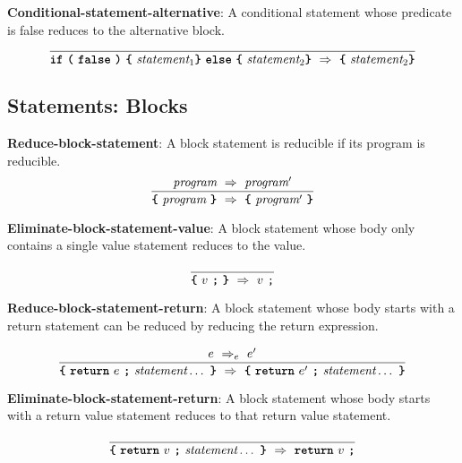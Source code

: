 \textbf{Conditional-statement-alternative}: A conditional statement
whose predicate is false reduces to the alternative block.
\[
\frac{
}{  
  \textbf{\texttt{if}}\ 
  \textbf{\texttt{(}}\ 
  \textbf{\texttt{false}} \ 
  \textbf{\texttt{)}} \ 
  \textbf{\texttt{\{}} \
  \textit{statement}_1
  \textbf{\texttt{\}}} \ 
  \textbf{\texttt{else}} \ 
  \textbf{\texttt{\{}} \
\textit{statement}_2  
  \textbf{\texttt{\}}}
\ \Rightarrow \ 
  \textbf{\texttt{\{}} \
  \textit{statement}_2 
  \textbf{\texttt{\}}}
}
\]

\subsection*{Statements: Blocks}

\textbf{Reduce-block-statement}: A block statement is
reducible if its program is reducible.
\[
\frac{
  \textit{program} 
\ \Rightarrow \ 
  \textit{program}'
}{  
  \textbf{\texttt{\{}} \
  \textit{program} \ 
  \textbf{\texttt{\}}}
\  \Rightarrow \ 
  \textbf{\texttt{\{}} \
  \textit{program}' \ 
  \textbf{\texttt{\}}}
}
\]

\vspace{10mm}

\textbf{Eliminate-block-statement-value}: A block statement 
whose body only contains a single value statement reduces to
the value.

\[
\frac{
}{  
  \textbf{\texttt{\{}} \
  v \ 
  \textbf{\texttt{;}} \ 
  \textbf{\texttt{\}}}
\  \Rightarrow \ 
  v\ \texttt{;}
}
\]

\vspace{10mm}

\textbf{Reduce-block-statement-return}: A block statement 
whose body starts with a return statement can 
be reduced by reducing the return expression.

\[
\frac{
  e
\ \Rightarrow_e \ 
  e'
}{  
  \textbf{\texttt{\{}} \
  \textbf{\texttt{return}} \ e \ 
  \textbf{\texttt{;}} \ 
  \textit{statement} \ldots\ 
  \textbf{\texttt{\}}}
\  \Rightarrow \ 
  \textbf{\texttt{\{}} \
  \textbf{\texttt{return}} \ e' \ 
  \textbf{\texttt{;}} \ 
  \textit{statement} \ldots\ 
  \textbf{\texttt{\}}}
}
\]

\vspace{10mm}

\textbf{Eliminate-block-statement-return}: A block statement 
whose body starts with a return value statement reduces to
that return value statement.

\[
\frac{
}{  
  \textbf{\texttt{\{}} \
  \textbf{\texttt{return}} \ v \ 
  \textbf{\texttt{;}} \ 
  \textit{statement} \ldots\ 
  \textbf{\texttt{\}}}
\  \Rightarrow \ 
  \textbf{\texttt{return}} \ v \ 
  \textbf{\texttt{;}} 
}
\]


